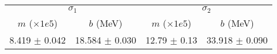 \begin{tabular}{cc|cc}
\multicolumn{2}{c|}{$\sigma_1$} & \multicolumn{2}{|c}{$\sigma_2$} \\
$m$ ($\times1e5$) & $b$ (MeV) & $m$ ($\times1e5$) & $b$ (MeV) \\
\hline
8.419 $\pm$ 0.042 & 18.584 $\pm$ 0.030 & 12.79 $\pm$ 0.13 & 33.918 $\pm$ 0.090\\
\end{tabular}
